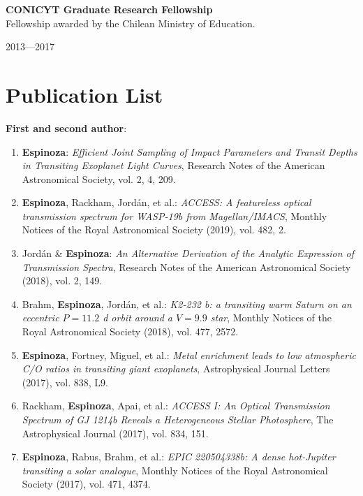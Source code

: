 \documentclass[12pt, a4paper]{article} %
\begin{document}
\begin{minipage}[t]{0.7\textwidth}
\begin{flushleft}%
  \setlength{\leftskip}{0.2cm}%
\textbf{CONICYT Graduate Research Fellowship}\\
Fellowship awarded by the Chilean Ministry of Education.
\end{flushleft}
\end{minipage}
\begin{minipage}[t]{0.3\textwidth}
\hfill 2013---2017
\end{minipage}

\section*{Publication List}
\begin{flushleft}%
  \setlength{\leftskip}{0.2cm}%
\textbf{First and second author}:
\begin{enumerate}
\setlength\itemsep{0.05cm}
\item \textbf{Espinoza}: \textit{Efficient Joint Sampling of Impact Parameters and Transit Depths in Transiting Exoplanet Light Curves}, Research Notes of the American Astronomical Society, vol. 2, 4, 209.
\item \textbf{Espinoza}, Rackham, Jord\'an, et al.: \textit{ACCESS: A featureless optical transmission spectrum for WASP-19b from Magellan/IMACS}, Monthly Notices of the Royal Astronomical Society (2019), vol. 482, 2.
\item Jord\'an \& \textbf{Espinoza}: \textit{An Alternative Derivation of the Analytic Expression of Transmission Spectra}, Research Notes of the American Astronomical Society (2018), vol. 2, 149.
\item Brahm, \textbf{Espinoza}, Jord\'an, et al.: \textit{K2-232 b: a transiting warm Saturn on an eccentric $P = 11.2$ d orbit around a $V = 9.9$ star}, Monthly Notices of the Royal Astronomical Society (2018), vol. 477, 2572.
\item \textbf{Espinoza}, Fortney, Miguel, et al.: \textit{Metal enrichment leads to low atmospheric C/O ratios in transiting giant exoplanets}, Astrophysical Journal Letters (2017), vol. 838, L9.
\item Rackham, \textbf{Espinoza}, Apai, et al.: \textit{ACCESS I: An Optical Transmission Spectrum of GJ 1214b Reveals a Heterogeneous Stellar Photosphere}, The Astrophysical Journal (2017), vol. 834, 151.
\item \textbf{Espinoza}, Rabus, Brahm, et al.: \textit{EPIC 220504338b: A dense hot-Jupiter transiting a solar analogue}, Monthly Notices of the Royal Astronomical Society (2017), vol. 471, 4374.

\end{enumerate}
\end{flushleft}
\end{document}
